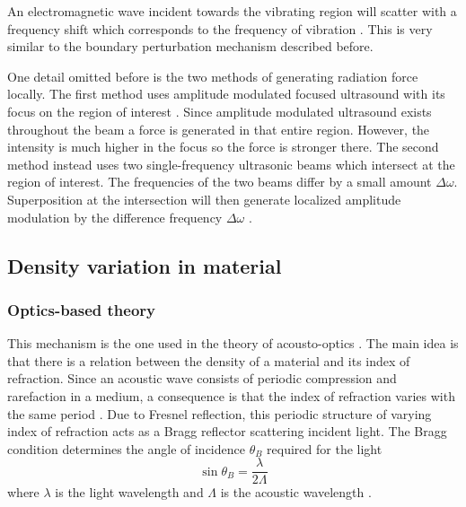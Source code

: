 \documentclass[10pt,a4paper,twocolumn,draft]{scrartcl}
\begin{document}
	An electromagnetic wave incident towards the vibrating region will scatter with a frequency shift which corresponds to the frequency of vibration \cite{Top2014}. This is very similar to the boundary perturbation mechanism described before.
	
	One detail omitted before is the two methods of generating radiation force locally. The first method uses amplitude modulated focused ultrasound with its focus on the region of interest \cite{Top2016}. Since amplitude modulated ultrasound exists throughout the beam a force is generated in that entire region. However, the intensity is much higher in the focus so the force is stronger there. The second method instead uses two single-frequency ultrasonic beams which intersect at the region of interest. The frequencies of the two beams differ by a small amount $\Delta \omega$. Superposition at the intersection will then generate localized amplitude modulation by the difference frequency $\Delta \omega$ \cite{Fatemi1998}.
	
	\subsection{Density variation in material}
	
	\subsubsection{Optics-based theory}
	This mechanism is the one used in the theory of acousto-optics \cite{Saleh2007}\cite{Korpel1981}. The main idea is that there is a relation between the density of a material and its index of refraction. Since an acoustic wave consists of periodic compression and rarefaction in a medium, a consequence is that the index of refraction varies with the same period \cite{Saleh2007}. Due to Fresnel reflection, this periodic structure of varying index of refraction acts as a Bragg reflector scattering incident light. The Bragg condition determines the angle of incidence $\theta_B$ required for the light
	\begin{equation*}
		\sin{\theta_B} = \frac{\lambda}{2\Lambda}
	\end{equation*}
	where $\lambda$ is the light wavelength and $\Lambda$ is the acoustic wavelength \cite{Saleh2007}.
	
\end{document}
